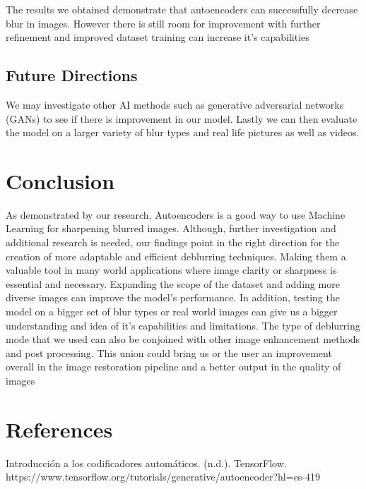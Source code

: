 \documentclass[conference]{IEEEtran}
\begin{document}
The results we obtained demonstrate that autoencoders can successfully decrease blur in images.
However there is still room for improvement with further refinement and improved dataset training can increase it's capabilities


\subsection{Future Directions}
We may investigate other AI methods such as generative adversarial networks (GANs) to see if there is improvement in our model. Lastly we can then evaluate the model on a larger variety of blur types and real life pictures as well as videos.




\section{Conclusion}
As demonstrated by our research, Autoencoders is a good way to use Machine Learning for sharpening blurred images. Although, further investigation and additional research is needed, our findings point in the right direction for the creation of more adaptable and efficient deblurring techniques.
Making them a valuable tool in many world applications where image clarity or sharpness is essential and necessary.
Expanding the scope of the dataset and adding more diverse images can improve the model's performance.
In addition, testing the model on a bigger set of blur types or real world images can give us a bigger understanding and idea of it's capabilities and limitations.
The type of deblurring mode that we used can also be conjoined with other image enhancement methods and post processing.
This union could bring us or the user an improvement overall in the image restoration pipeline and a better output in the quality of images


\section{References}
Introducción a los codificadores automáticos. (n.d.). TensorFlow. https://www.tensorflow.org/tutorials/generative/autoencoder?hl=es-419



%
%
\end{document}
